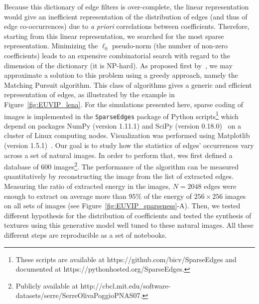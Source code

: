 \documentclass[a4paper, 10pt, twocolumns]{article}
\newcommand{\url}[1]{{\rm #1}}
\begin{document}
Because this dictionary of edge filters is over-complete, the linear representation would give an inefficient representation of the distribution of edges (and thus of edge co-occurrences) due to {\it a  priori} correlations between coefficients. Therefore, starting from this linear representation, we searched for the most sparse representation. Minimizing the $\ell_0$ pseudo-norm (the number of non-zero coefficients) leads to an expensive combinatorial search with regard to the dimension of the dictionary (it is NP-hard). As proposed first by~\citep{Perrinet02sparse}, we may approximate a solution to this problem using a greedy approach, namely the Matching Pursuit algorithm. This class of algorithms gives a generic and efficient representation of edges, as illustrated by the example in Figure~\ref{fig:EUVIP_lena}. For the simulations presented here, sparse coding of images is implemented in the \verb+SparseEdges+ package of Python scripts\footnote{These scripts are available at \url{https://github.com/bicv/SparseEdges} and documented at \url{https://pythonhosted.org/SparseEdges}.} which depend on packages NumPy (version 1.11.1) and SciPy (version 0.18.0)~\citep{Oliphant07} on a cluster of Linux computing nodes. Visualization was performed using Matplotlib (version 1.5.1)~\citep{Hunter07}. Our goal is to study how the statistics of edges' occurrences vary across a set of natural images. In order to perform that, wes first defined a database of $600$ images\footnote{Publicly available at \url{http://cbcl.mit.edu/software-datasets/serre/SerreOlivaPoggioPNAS07}.}. The performance of the algorithm can be measured quantitatively by reconstructing the image from the list of extracted edges. Measuring the ratio of extracted energy in the images, $N=2048$ edges were enough to extract on average more than $95\%$ of the energy of $256\times 256$ images on all sets of images (see Figure~\ref{fig:EUVIP_sparseness}-A). Then, we tested different hypothesis for the distribution of coefficients and tested the synthesis of textures using this generative model well tuned to these natural images. All these different steps are reproducible as a set of notebooks.%
\end{document}
